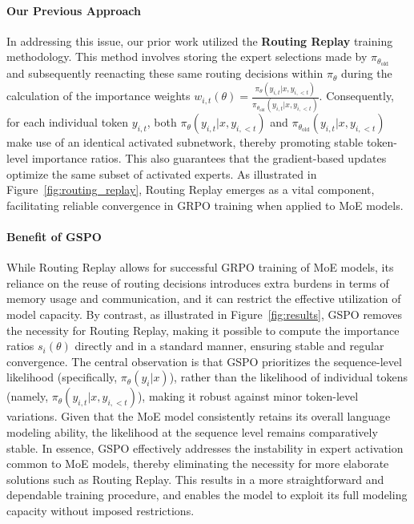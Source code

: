 \paragraph{Our Previous Approach} In addressing this issue, our prior work utilized the \textbf{Routing Replay} training methodology. This method involves storing the expert selections made by $\pi_{\theta_\text{old}}$ and subsequently reenacting these same routing decisions within $\pi_{\theta}$ during the calculation of the importance weights $w_{i,t}(\theta) = \frac{ \pi_{\theta} (y_{i,t} | x, y_{i,<t}) }{ \pi_{\theta_\text{old}} (y_{i,t} | x,y_{i,<t})}$. Consequently, for each individual token $y_{i,t}$, both $\pi_{\theta} (y_{i,t} | x, y_{i,<t})$ and $\pi_{\theta_\text{old}} (y_{i,t} | x,y_{i,<t})$ make use of an identical activated subnetwork, thereby promoting stable token-level importance ratios. This also guarantees that the gradient-based updates optimize the same subset of activated experts. As illustrated in Figure~\ref{fig:routing_replay}, Routing Replay emerges as a vital component, facilitating reliable convergence in GRPO training when applied to MoE models.

\paragraph{Benefit of GSPO} While Routing Replay allows for successful GRPO training of MoE models, its reliance on the reuse of routing decisions introduces extra burdens in terms of memory usage and communication, and it can restrict the effective utilization of model capacity. By contrast, as illustrated in Figure~\ref{fig:results}, GSPO removes the necessity for Routing Replay, making it possible to compute the importance ratios $s_i(\theta)$ directly and in a standard manner, ensuring stable and regular convergence. The central observation is that GSPO prioritizes the sequence-level likelihood (specifically, $\pi_{\theta} (y_i | x)$), rather than the likelihood of individual tokens (namely, $\pi_{\theta} (y_{i,t} | x, y_{i,<t})$), making it robust against minor token-level variations. Given that the MoE model consistently retains its overall language modeling ability, the likelihood at the sequence level remains comparatively stable. In essence, GSPO effectively addresses the instability in expert activation common to MoE models, thereby eliminating the necessity for more elaborate solutions such as Routing Replay. This results in a more straightforward and dependable training procedure, and enables the model to exploit its full modeling capacity without imposed restrictions.

